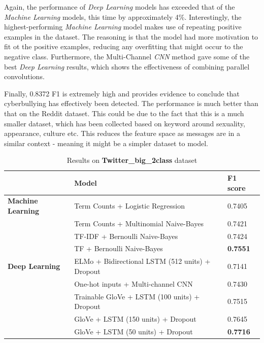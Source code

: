 \documentclass[12pt,a4paper]{article}
\begin{document}
Again, the performance of \textit{Deep Learning} models has exceeded that of the \textit{Machine Learning} models, this time by approximately 4\%. Interestingly, the highest-performing \textit{Machine Learning} model makes use of repeating positive examples in the dataset. The reasoning is that the model had more motivation to fit ot the positive examples, reducing any overfitting that might occur to the negative class. Furthermore, the Multi-Channel \textit{CNN} method gave some of the best \textit{Deep Learning} results, which shows the effectiveness of combining parallel convolutions. 

Finally, 0.8372 F1 is extremely high and provides evidence to conclude that cyberbullying has effectively been detected. The performance is much better than that on the Reddit dataset. This could be due to the fact that this is a much smaller dataset, which has been collected based on keyword around sexuality, appearance, culture etc. This reduces the feature space as messages are in a similar context - meaning it might be a simpler dataset to model.


\begin{table}[H]
	\centering
	\vspace*{-12pt}
	\caption{Results on \textbf{Twitter\_big\_2class} dataset}
	\label{results3}
	\hspace*{-0.8cm}
	\begin{tabular}{p{3.4cm} p{11cm} p{2cm}} \hline\hline
		& \textbf{Model} & \textbf{F1 score}  \\ \hline
		
		\textbf{Machine Learning} & Term Counts + Logistic Regression & 0.7405  \\
		& Term Counts + Multinomial Naive-Bayes & 0.7421  \\
		& TF-IDF + Bernoulli Naive-Bayes & 0.7424  \\
		& TF + Bernoulli Naive-Bayes & \textbf{0.7551} \\ \hline
		
		\textbf{Deep Learning} & ELMo + Bidirectional LSTM (512 units) + Dropout & 0.7141 \\
		&  One-hot inputs + Multi-channel CNN & 0.7430 \\
		&  Trainable GloVe + LSTM (100 units) + Dropout & 0.7515  \\  
		&  GloVe + LSTM (150 units) + Dropout & 0.7645  \\
		&  GloVe + LSTM (50 units) + Dropout & \textbf{0.7716} \\ \hline
	\end{tabular}
\end{table}
\end{document}
